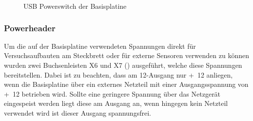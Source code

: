 \begin{figure}[H]
    \centering
    \qquad
    \qquad
    \caption[USB Powerswitch der Basisplatine]{USB Powerswitch der \gls{Basisplatine}}
    \label{fig:basisplatine-power}
\end{figure}

\subsubsection{Powerheader}
Um die auf der \gls{Basisplatine} verwendeten Spannungen direkt für Versuchsaufbauten am Steckbrett oder für externe Sensoren verwenden zu können wurden zwei Buchsenleisten X6 und X7 () ausgeführt, welche diese Spannungen bereitstellen. Dabei ist zu beachten, dass am \unit{12}{\volt}-Ausgang nur \unit{+12}{\volt} anliegen, wenn die Basisplatine über ein externes Netzteil mit einer Ausgangsspannung von \unit{+12}{\volt} betrieben wird. Sollte eine geringere Spannung über das Netzgerät eingespeist werden liegt diese am Ausgang an, wenn hingegen kein Netzteil verwendet wird ist dieser Ausgang spannungsfrei.

